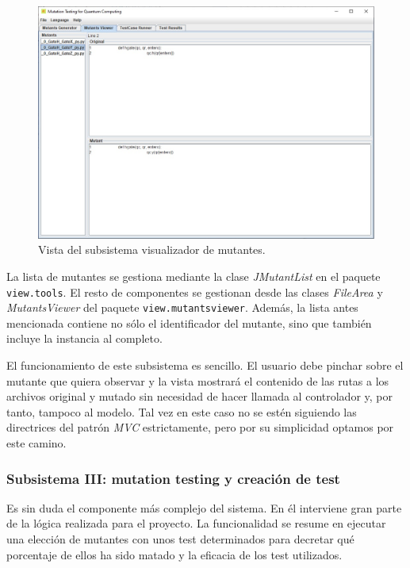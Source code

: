 \begin{figure}[t]
\begin{center}
\includegraphics[scale=0.45]{images/vista2}
\end{center}
\caption{Vista del subsistema visualizador de mutantes.}
\label{fig:vista2}
\end{figure}

La lista de mutantes se gestiona mediante la clase \textit{JMutantList} en el paquete \texttt{view.tools}. El resto de componentes se gestionan desde las clases \textit{FileArea} y \textit{MutantsViewer} del paquete \texttt{view.mutantsviewer}. Además, la lista antes mencionada contiene no sólo el identificador del mutante, sino que también incluye la instancia al completo.

El funcionamiento de este subsistema es sencillo. El usuario debe pinchar sobre el mutante que quiera observar y la vista mostrará el contenido de las rutas a los archivos original y mutado sin necesidad de hacer llamada al controlador y, por tanto, tampoco al modelo. Tal vez en este caso no se estén siguiendo las directrices del patrón \textit{MVC} estrictamente, pero por su simplicidad optamos por este camino.

\subsubsection{Subsistema III: mutation testing y creación de test}

Es sin duda el componente más complejo del sistema. En él interviene gran parte de la lógica realizada para el proyecto. La funcionalidad se resume en ejecutar una elección de mutantes con unos test determinados para decretar qué porcentaje de ellos ha sido matado y la eficacia de los test utilizados.


